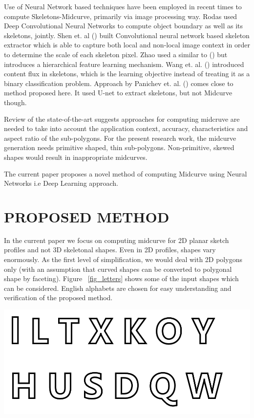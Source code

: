 \documentclass[9pt,academicons]{article}
\begin{document}
Use of Neural Network based techniques have been employed in recent times to compute Skeletons-Midcurve, primarily via image processing way. Rodas \cite{Rodas2019JointOB} used Deep Convolutional Neural Networks to compute object boundary as well as its skeletons, jointly. Shen et. al (\cite{shen2016object,Shen_2017}) built Convolutional neural network based skeleton extractor which is able to capture both local and non-local image context in order to determine the scale of each skeleton pixel. Zhao \cite{zhao2018hifi} used a similar to (\cite{shen2016object,Shen_2017}) but introduces a hierarchical feature learning mechanism. Wang et. al. (\cite{wang2018deepflux}) introduced content flux in skeletons, which is
the learning objective instead of treating it as a binary classification problem. Approach by Panichev et. al. (\cite{Panichev_2019_CVPR_Workshops}) comes close to method proposed here. It used U-net to extract skeletons, but not Midcurve though.
	
Review of the state-of-the-art suggests approaches for computing midcruve are needed to take into account the application context, accuracy, characteristics  and aspect ratio of the sub-polygons. For the present research work, the midcurve generation needs primitive shaped, thin sub-polygons. Non-primitive, skewed shapes would result in inappropriate midcurves.

The current paper proposes a novel method of computing Midcurve using Neural Networks i.e Deep Learning approach.
 
 
\section{PROPOSED METHOD}
\label{sec:proposedmethod}

In the current paper we focus on computing midcurve for 2D planar sketch profiles and not 3D skeletonal shapes.  Even in 2D profiles, shapes vary enormously. As the first level of simplification, we would deal with 2D polygons only (with an assumption that curved shapes can be converted to polygonal shape by faceting). Figure ~\ref{fig_letters} shows some of the input shapes which can be considered. English alphabets are chosen for easy understanding and verification of the proposed method.

     \begin{center}
	\includegraphics[width=0.8\linewidth]{images/Letters}
	\label{fig_letters}
    \end{center}
		
\end{document}
